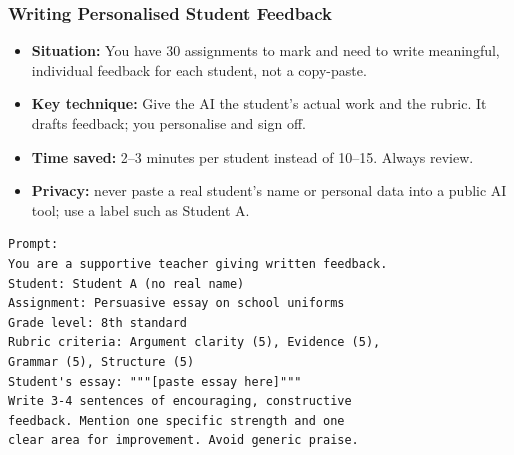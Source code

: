 \begin{frame}[fragile]\frametitle{Writing Personalised Student Feedback}

    \begin{itemize}
        \item \textbf{Situation:} You have 30 assignments to mark and need to write meaningful, individual feedback for each student, not a copy-paste.
        \item \textbf{Key technique:} Give the AI the student's actual work and the rubric. It drafts feedback; you personalise and sign off.
		\item \textbf{Time saved:} 2--3 minutes per student instead of 10--15. Always review.%
		\item \textbf{Privacy:} never paste a real student's name or personal data into a public AI tool; use a label such as Student A.

    \end{itemize}

\begin{lstlisting}[language=HTML]
Prompt:
You are a supportive teacher giving written feedback.
Student: Student A (no real name)
Assignment: Persuasive essay on school uniforms
Grade level: 8th standard
Rubric criteria: Argument clarity (5), Evidence (5),
Grammar (5), Structure (5)
Student's essay: """[paste essay here]"""
Write 3-4 sentences of encouraging, constructive 
feedback. Mention one specific strength and one 
clear area for improvement. Avoid generic praise.
\end{lstlisting}



\end{frame}


